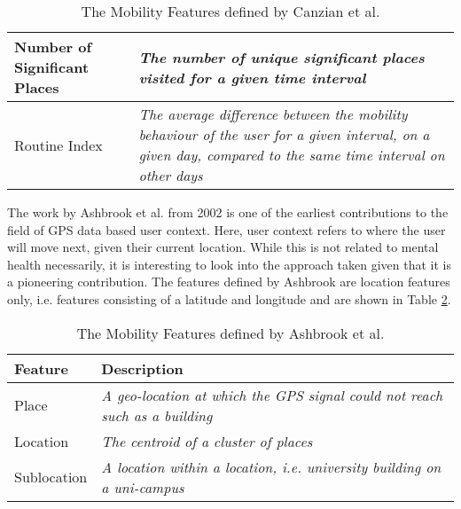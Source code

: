 \begin{table}[h]
\begin{tabular}{|p{}|p{}|}
Number of Significant Places & \textit{The number of unique significant places visited for a given time interval}                                                                                \\ \hline
Routine Index                & \textit{The average difference between the mobility behaviour of the user for a given interval, on a given day, compared to the same time interval on other days} \\ \hline
\end{tabular}
    \caption{The Mobility Features defined by Canzian et al. \cite{Canzian2015}}
    \label{tab:canzian-features}
\end{table}


The work by Ashbrook et al. \cite{learning_significant_locations} from 2002 is one of the earliest contributions to the field of GPS data based user context. Here, user context refers to where the user will move next, given their current location. While this is not related to mental health necessarily, it is interesting to look into the approach taken given that it is a pioneering contribution. The features defined by Ashbrook are location features only, i.e. features consisting of a latitude and longitude and are shown in Table \ref{tab:features-ashbrook}. 



\begin{table}[]
    \centering
\begin{tabular}{|p{}|p{}|}
\hline
\textbf{Feature} & \textbf{Description}                                                               \\ \hline
Place            & \textit{A geo-location at which the GPS signal could not reach such as a building} \\ \hline
Location         & \textit{The centroid of a cluster of places}                                       \\ \hline
Sublocation      & \textit{A location within a location, i.e. university building on a uni-campus}    \\ \hline
\end{tabular}
    \caption{The Mobility Features defined by Ashbrook et al. \cite{learning_significant_locations}}
    \label{tab:features-ashbrook}
\end{table}


